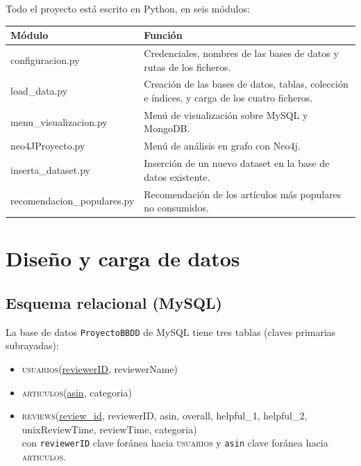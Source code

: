 \documentclass[11pt,a4paper]{article}
\newcommand{\code}[1]{\texttt{#1}}
\begin{document}
Todo el proyecto está escrito en Python, en seis módulos:

\begin{table}[H]
\centering
\small
\begin{tabularx}{\linewidth}{@{}>{\ttfamily}lX@{}}
\toprule
\normalfont\textbf{Módulo} & \textbf{Función}\\
\midrule
configuracion.py & Credenciales, nombres de las bases de datos y rutas de los ficheros.\\
load\_data.py & Creación de las bases de datos, tablas, colección e índices, y carga de los cuatro ficheros.\\
menu\_visualizacion.py & Menú de visualización sobre MySQL y MongoDB.\\
neo4JProyecto.py & Menú de análisis en grafo con Neo4j.\\
inserta\_dataset.py & Inserción de un nuevo dataset en la base de datos existente.\\
recomendacion\_populares.py & Recomendación de los artículos más populares no consumidos.\\
\bottomrule
\end{tabularx}
\end{table}

\section{Diseño y carga de datos}

\subsection{Esquema relacional (MySQL)}

La base de datos \code{ProyectoBBDD} de MySQL tiene tres tablas (claves primarias subrayadas):

\begin{itemize}
\item \textsc{usuarios}(\underline{reviewerID}, reviewerName)
\item \textsc{articulos}(\underline{asin}, categoria)
\item \textsc{reviews}(\underline{review\_id}, reviewerID, asin, overall, helpful\_1, helpful\_2, unixReviewTime, reviewTime, categoria)\\
con \code{reviewerID} clave foránea hacia \textsc{usuarios} y \code{asin} clave foránea hacia \textsc{articulos}.
\end{itemize}
\end{document}
